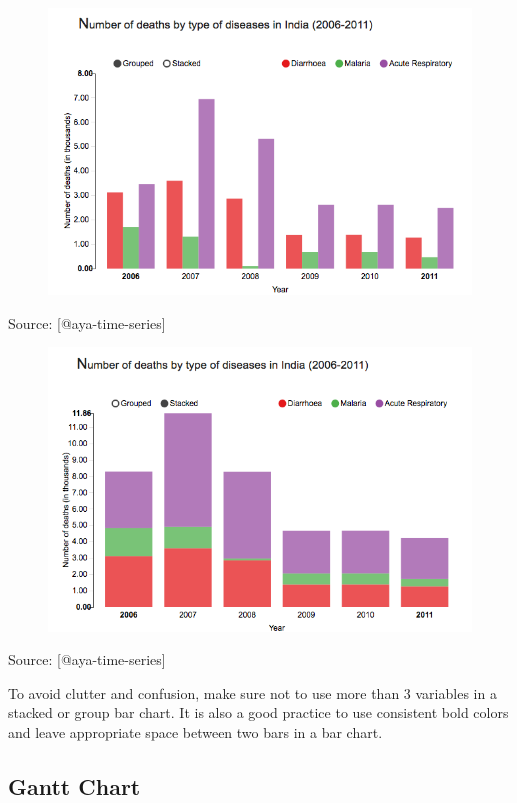 \documentclass[]{book}
\theoremstyle{definition}
\theoremstyle{definition}
\theoremstyle{definition}
\theoremstyle{remark}
\begin{document}
\begin{figure}
\centering
\includegraphics{images/aya-bar1.png}
\caption{}
\end{figure}

Source: {[}@aya-time-series{]}

\begin{figure}
\centering
\includegraphics{images/aya-bar2.png}
\caption{}
\end{figure}

Source: {[}@aya-time-series{]}

To avoid clutter and confusion, make sure not to use more than 3
variables in a stacked or group bar chart. It is also a good practice to
use consistent bold colors and leave appropriate space between two bars
in a bar chart.

\subsection{Gantt Chart}\label{gantt-chart}
\end{document}
